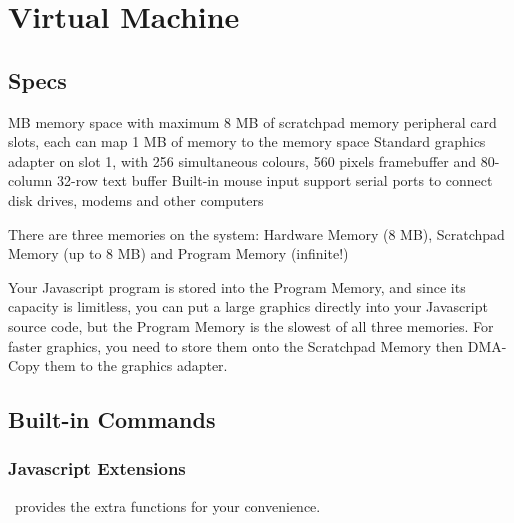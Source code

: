 \chapter{Virtual Machine}

\section{Specs}

\begin{outline}
 MB memory space with maximum 8 MB of scratchpad memory
 peripheral card slots, each can map 1 MB of memory to the memory space
\1 Standard graphics adapter on slot 1, with 256 simultaneous colours, 560 pixels framebuffer and 80-column 32-row text buffer
\1 Built-in mouse input support
 serial ports to connect disk drives, modems and other computers
\end{outline}

There are three memories on the system: Hardware Memory (8 MB), Scratchpad Memory (up to 8 MB) and Program Memory (infinite!)

Your Javascript program is stored into the Program Memory, and since its capacity is limitless, you can put a large graphics directly into your Javascript source code, but the Program Memory is the slowest of all three memories. For faster graphics, you need to store them onto the Scratchpad Memory then DMA-Copy them to the graphics adapter.

\section{Built-in Commands}

\subsection{Javascript Extensions}

\thismachine\ provides the extra functions for your convenience.

\begin{outline}
\1
\1
\1
\1
\1
\1
\end{outline}

